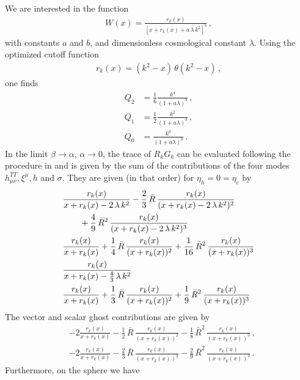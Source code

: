 \documentclass[11pt]{book} %
\begin{document}
{We are interested in the function
\begin{align}
  W(x) = \frac{r_k(x)}{[x+r_k(x)+a \, \lambda \, k^2]^b} \,,
\end{align}
with constants $a$ and $b$, and dimensionless cosmological constant $\lambda$.
Using the optimized cutoff function
\begin{align}
  r_k(x) = (k^2-x) \, \theta( k^2-x) \,,
\end{align}
one finds
\begin{align}
  Q_2 &= \frac 16 \frac {k^4}{(1 + a \lambda)^b} \,, \\
  Q_1 &= \frac 12 \frac {k^2}{(1 + a \lambda)^b} \,, \\
  Q_0 &= \frac {k^0}{(1 + a \lambda)^b} \,.
\end{align}
In the limit $\beta \rightarrow \alpha$, $\alpha \rightarrow 0$,
the trace of $R_k G_k$ can be evaluated following the procedure in
\cite{Gies:2015tca} and is given by the sum of the contributions
of the four modes $h^{TT}_{\mu\nu}, \xi^{\mu}, h$ and $\sigma$. They are given
(in that order) for $\eta_h=0=\eta_c$ by
\begin{align}
  & \frac{r_k(x)}{x+r_k(x) - 2 \, \lambda \, k^2} - \frac 23 \, \bar R \, \frac{r_k(x)}{(x+r_k(x) - 2 \, \lambda \, k^2) ^2} \notag \\
    &\hspace*{0.7cm} + \frac 49 \, \bar R^2 \, \frac{r_k(x)}{(x+r_k(x) - 2 \, \lambda \, k^2) ^3} \\
  & \frac{r_k(x)}{x+r_k(x)} + \frac 14 \, \bar R \, \frac{r_k(x)}{(x+r_k(x)) ^2} + \frac{1}{16} \, \bar R^2 \, \frac{r_k(x)}{(x+r_k(x)) ^3} \\
  & \frac{r_k(x)}{x+r_k(x) - \frac 43 \, \lambda \, k^2} \\
  & \frac{r_k(x)}{x+r_k(x)} + \frac 13 \, \bar R \, \frac{r_k(x)}{(x+r_k(x)) ^2} + \frac{1}{9} \, \bar R^2 \, \frac{r_k(x)}{(x+r_k(x)) ^3}
\end{align}
The vector and scalar ghost contributions are given by
\begin{align}
  & - 2 \frac{r_k(x)}{x+r_k(x)} - \frac 12 \, \bar R \, \frac{r_k(x)}{(x+r_k(x)) ^2} - \frac{1}{8} \, \bar R^2 \, \frac{r_k(x)}{(x+r_k(x)) ^3} \,, \\
  & - 2 \frac{r_k(x)}{x+r_k(x)} - \frac 23 \, \bar R \, \frac{r_k(x)}{(x+r_k(x)) ^2} - \frac{2}{9} \, \bar R^2 \, \frac{r_k(x)}{(x+r_k(x)) ^3} \,.
\end{align}
Furthermore, on the sphere we have
\begin{align}

\end{align}}
\end{document}
